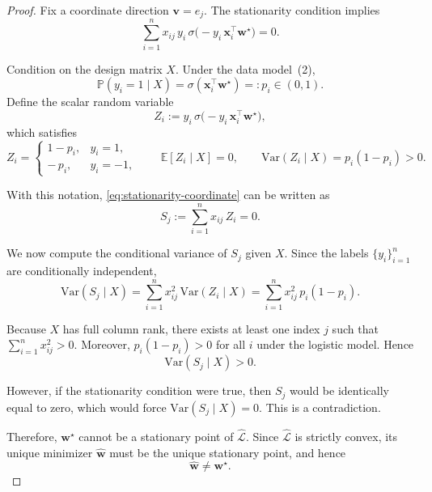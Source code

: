 \documentclass{article}
\theoremstyle{plain}
\newtheorem{proposition}[theorem]{Proposition}
\theoremstyle{definition}
\theoremstyle{remark}
\begin{document}
{\begin{proof}
Fix a coordinate direction $\mathbf v=e_j$.
The stationarity condition implies
\begin{equation}
\sum_{i=1}^n
x_{ij}\,
y_i\,\sigma\!\big(-y_i\,\mathbf x_i^\top \mathbf w^\star\big)
=0.
\label{eq:stationarity-coordinate}
\end{equation}

Condition on the design matrix $X$.
Under the data model~(2),
\[
\mathbb P(y_i=1\mid X)=\sigma(\mathbf x_i^\top \mathbf w^\star)=:p_i\in(0,1).
\]
Define the scalar random variable
\[
Z_i := y_i\,\sigma\!\big(-y_i\,\mathbf x_i^\top \mathbf w^\star\big),
\]
which satisfies
\[
Z_i =
\begin{cases}
1-p_i, & y_i=1,\\
-\,p_i, & y_i=-1,
\end{cases}
\qquad
\mathbb E[Z_i\mid X]=0,
\qquad
\mathrm{Var}(Z_i\mid X)=p_i(1-p_i)>0.
\]

With this notation, \eqref{eq:stationarity-coordinate} can be written as
\[
S_j := \sum_{i=1}^n x_{ij}\,Z_i = 0 .
\]

We now compute the conditional variance of $S_j$ given $X$.
Since the labels $\{y_i\}_{i=1}^n$ are conditionally independent,
\[
\mathrm{Var}(S_j\mid X)
=
\sum_{i=1}^n x_{ij}^2\,\mathrm{Var}(Z_i\mid X)
=
\sum_{i=1}^n x_{ij}^2\,p_i(1-p_i).
\]

Because $X$ has full column rank, there exists at least one index $j$ such that
$\sum_{i=1}^n x_{ij}^2>0$.
Moreover, $p_i(1-p_i)>0$ for all $i$ under the logistic model.
Hence
\[
\mathrm{Var}(S_j\mid X) > 0.
\]

However, if the stationarity condition were true, then $S_j$ would be identically
equal to zero, which would force $\mathrm{Var}(S_j\mid X)=0$.
This is a contradiction.

Therefore, $\mathbf w^\star$ cannot be a stationary point of
$\widehat{\mathcal L}$.
Since $\widehat{\mathcal L}$ is strictly convex, its unique minimizer
$\widehat{\mathbf w}$ must be the unique stationary point, and hence
\[
\widehat{\mathbf w}\neq \mathbf w^\star.
\]


\end{proof}



}
\end{document}
